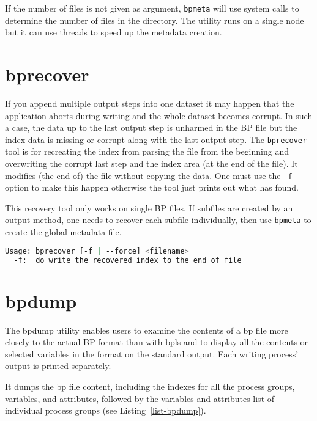 If the number of files is not given as argument, \verb+bpmeta+ will use system calls to determine the number of files in the directory. The utility runs on a single node but it can use threads to speed up the metadata creation. 

\section{bprecover}
\label{section-utils-bprecover}

If you append multiple output steps into one dataset it may happen that the application aborts during writing and the whole dataset becomes corrupt. In such a case, the data up to the last output step is unharmed in the BP file but the index data is missing or corrupt along with the last output step. The \verb+bprecover+ tool is for recreating the index from parsing the file from the beginning and overwriting the corrupt last step and the index area (at the end of the file). It modifies (the end of) the file without copying the data. One must use the \verb+-f+ option to make this happen otherwise the tool just prints out what has found. 

This recovery tool only works on single BP files. If subfiles are created by an output method, one needs to recover each subfile individually, then use \verb+bpmeta+ to create the global metadata file. 

\begin{lstlisting}[language=bash,caption={},label={}] 
Usage: bprecover [-f | --force] <filename>
  -f:  do write the recovered index to the end of file
\end{lstlisting}


\section{bpdump}

The bpdump utility enables users to examine the contents of a bp file more closely 
to the actual BP format than with bpls and to display all the contents or selected 
variables in the format on the standard output. Each writing process' output is 
printed separately. 

It dumps the bp file content, including the indexes for all the process groups, 
variables, and attributes, followed by the variables and attributes list of individual 
process groups (see Listing~\ref{list-bpdump}).

